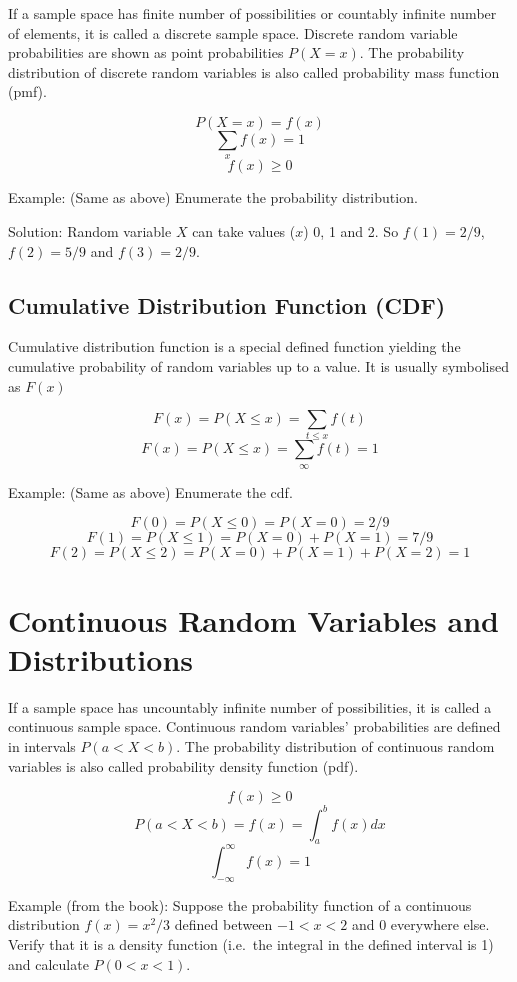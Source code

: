 \documentclass[]{book}
\theoremstyle{definition}
\theoremstyle{definition}
\theoremstyle{definition}
\theoremstyle{remark}
\begin{document}
If a sample space has finite number of possibilities or countably
infinite number of elements, it is called a discrete sample space.
Discrete random variable probabilities are shown as point probabilities
\(P(X = x)\). The probability distribution of discrete random variables
is also called probability mass function (pmf).

\[ P(X=x) = f(x)\] \[\sum_x f(x) = 1\] \[f(x) \ge 0\]

Example: (Same as above) Enumerate the probability distribution.

Solution: Random variable \(X\) can take values (\(x\)) 0, 1 and 2. So
\(f(1) = 2/9\), \(f(2) = 5/9\) and \(f(3) = 2/9\).

\hypertarget{cumulative-distribution-function-cdf}{%
\subsection{Cumulative Distribution Function
(CDF)}\label{cumulative-distribution-function-cdf}}

Cumulative distribution function is a special defined function yielding
the cumulative probability of random variables up to a value. It is
usually symbolised as \(F(x)\)

\[F(x) = P(X \le x) = \sum_{t \le x} f(t)\]
\[F(x) = P(X \le x) = \sum_{\infty} f(t) = 1\]

Example: (Same as above) Enumerate the cdf.

\[F(0) = P(X \le 0) = P(X = 0) = 2/9\]
\[F(1) = P(X \le 1) = P(X = 0) + P(X = 1) = 7/9\]
\[F(2) = P(X \le 2) = P(X = 0) + P(X = 1) + P(X = 2) = 1\]

\hypertarget{continuous-random-variables-and-distributions}{%
\section{Continuous Random Variables and
Distributions}\label{continuous-random-variables-and-distributions}}

If a sample space has uncountably infinite number of possibilities, it
is called a continuous sample space. Continuous random variables'
probabilities are defined in intervals \(P(a < X < b)\). The probability
distribution of continuous random variables is also called probability
density function (pdf).

\[f(x) \ge 0\] \[ P(a < X < b) = f(x) = \int_a^b f(x)dx\]
\[\int_{- \infty}^\infty f(x) = 1\]

Example (from the book): Suppose the probability function of a
continuous distribution \(f(x) = x^2/3\) defined between \(-1 < x < 2\)
and \(0\) everywhere else. Verify that it is a density function
(i.e.~the integral in the defined interval is 1) and calculate
\(P(0 < x < 1)\).
\end{document}

